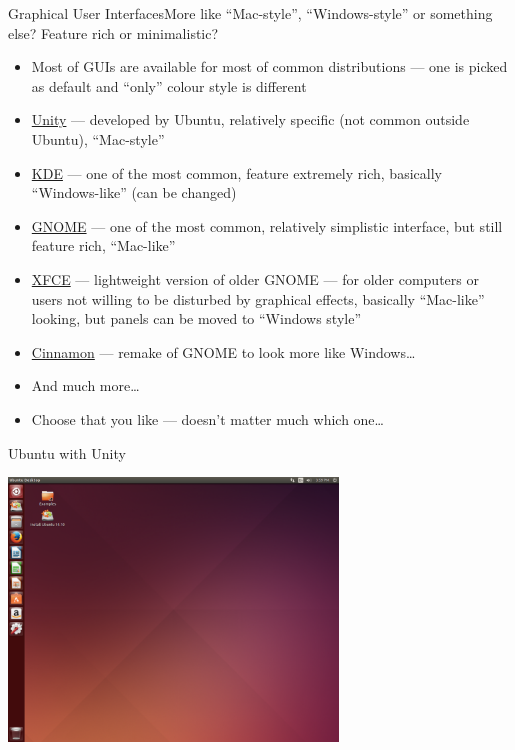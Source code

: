 \documentclass[compress, ucs, xelatex, 11pt, xcolor=svgnames,
  hyperref={
    bookmarks=true,
    unicode=true,
    colorlinks=true,
    pdftitle={Linux, command line and MetaCentrum},
    plainpages=false,
    pdfauthor={Vojtech Zeisek},
    pdfsubject={Course about use of Linux command line, writing shell scripts and using MetaCentrum of CESNET},
    pdfcreator={XeLaTeX, http://www.xelatex.org/},
    pdfkeywords={Linux, GNU, BASH, shell, command line, MetaCentrum},
    linkcolor=Sienna,
    anchorcolor=black,
    citecolor=green,
    filecolor=magenta,
    menucolor=Sienna,
    urlcolor=cyan,
    pdftex},
  url={hyphens, lowtilde} %
  ]{beamer}
\begin{document}
\begin{frame}{Graphical User Interfaces}{More like ``Mac-style'', ``Windows-style'' or something else? Feature rich or minimalistic?}
\begin{itemize}
  \item Most of GUIs are available for most of common distributions --- one is picked as default and ``only'' colour style is different
  \item \href{https://unity.ubuntu.com/}{Unity} --- developed by Ubuntu, relatively specific (not common outside Ubuntu), ``Mac-style''
  \item \href{https://www.kde.org/}{KDE} --- one of the most common, feature extremely rich, basically ``Windows-like'' (can be changed)
  \item \href{https://www.gnome.org/}{GNOME} --- one of the most common, relatively simplistic interface, but still feature rich, ``Mac-like''
  \item \href{http://xfce.org/}{XFCE} --- lightweight version of older GNOME --- for older computers or users not willing to be disturbed by graphical effects, basically ``Mac-like'' looking, but panels can be moved to ``Windows style''
  \item \href{http://cinnamon.linuxmint.com/}{Cinnamon} --- remake of GNOME to look more like Windows\ldots
  \item And much more\ldots
  \item Choose that you like --- doesn't matter much which one\ldots
\end{itemize}
\end{frame}

\begin{frame}{Ubuntu with Unity}
\begin{center}
  \includegraphics[height=7cm]{ubuntu.png}
\end{center}
\end{frame}
\end{document}
